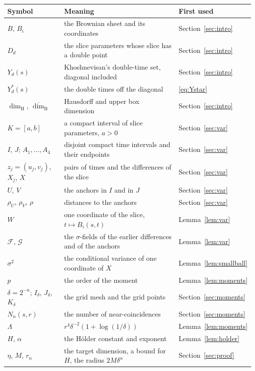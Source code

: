 \documentclass[11pt]{amsart}
\theoremstyle{remark}
\newcommand{\dimH}{\dim_{\mathrm H}}
\newcommand{\dimB}{\overline{\dim}_{\mathrm B}}
\begin{document}
\begin{center}
\small
\begin{tabular}{lll}
\toprule
Symbol & Meaning & First used\\
\midrule
$B$, $B_i$ & the Brownian sheet and its coordinates & Section~\ref{sec:intro}\\
$D_d$ & the slice parameters whose slice has a double point & Section~\ref{sec:intro}\\
$Y_d(s)$ & Khoshnevisan's double-time set, diagonal included & Section~\ref{sec:intro}\\
$Y^*_d(s)$ & the double times off the diagonal & \eqref{eq:Ystar}\\
$\dimH$, $\dimB$ & Hausdorff and upper box dimension & Section~\ref{sec:intro}\\
$K=[a,b]$ & a compact interval of slice parameters, $a>0$ & Section~\ref{sec:var}\\
$I$, $J$; $A_1,\dots,A_4$ & disjoint compact time intervals and their endpoints & Section~\ref{sec:var}\\
$z_j=(u_j,v_j)$, $X_j$, $X$ & pairs of times and the differences of the slice & Section~\ref{sec:var}\\
$U$, $V$ & the anchors in $I$ and in $J$ & Section~\ref{sec:var}\\
$\rho_U$, $\rho_V$, $\rho$ & distances to the anchors & Section~\ref{sec:var}\\
$W$ & one coordinate of the slice, $t\mapsto B_i(s,t)$ & Lemma~\ref{lem:var}\\
$\mathcal F$, $\mathcal G$ & the $\sigma$-fields of the earlier differences and of the anchors & Lemma~\ref{lem:var}\\
$\sigma^2$ & the conditional variance of one coordinate of $X$ & Lemma~\ref{lem:smallball}\\
$p$ & the order of the moment & Lemma~\ref{lem:moments}\\
$\delta=2^{-n}$; $I_\delta$, $J_\delta$, $K_\delta$ & the grid mesh and the grid points & Section~\ref{sec:moments}\\
$N_n(s,r)$ & the number of near-coincidences & Section~\ref{sec:moments}\\
$\Lambda$ & $r^4\delta^{-2}(1+\log(1/\delta))$ & Lemma~\ref{lem:moments}\\
$H$, $\alpha$ & the H\"older constant and exponent & Lemma~\ref{lem:holder}\\
$\eta$, $M$, $r_n$ & the target dimension, a bound for $H$, the radius $2M\delta^\alpha$ & Section~\ref{sec:proof}\\
\bottomrule
\end{tabular}
\end{center}
\end{document}
